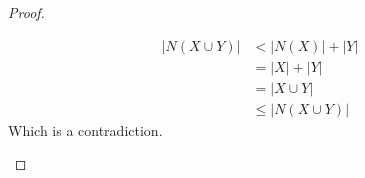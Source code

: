 \documentclass[openany]{report}
\begin{document}
\begin{proof}
\begin{itemize}
\begin{itemize}
            \begin{align*}
                |N(X \cup Y)| &< |N(X)| + |Y|\\
                &= |X| + |Y|\\
                &= |X \cup Y|\\
                &\leq |N(X \cup Y)|
            \end{align*}
            Which is a contradiction. 
        \end{itemize}
    \end{itemize}
\end{proof}
\end{document}
